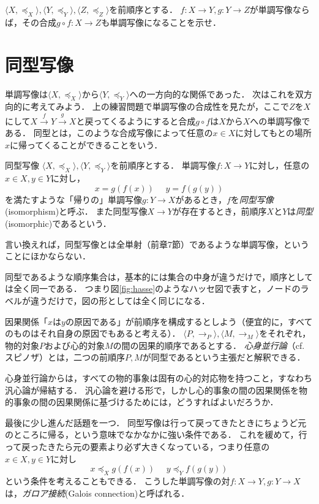 \documentclass[dvipdfmx,11pt,a4paper]{jsarticle}
\begin{document}
\begin{exercise}[単調写像の合成]
$\langle X, \preceq_X \rangle, \langle Y, \preceq_Y \rangle, \langle Z, \preceq_Z \rangle$を前順序とする．
$f:X \to Y, g:Y \to Z$が単調写像ならば，その合成$g \circ f: X \to Z$も単調写像になることを示せ． 
\end{exercise}


\section{同型写像}
単調写像は$\langle X, \preceq_X \rangle$から$\langle Y, \preceq_Y \rangle$への一方向的な関係であった．
次はこれを双方向的に考えてみよう．
上の練習問題で単調写像の合成性を見たが，ここで$Z$を$X$にして$X \xrightarrow{f} Y \xrightarrow{g} X$と戻ってくるようにすると合成$g \circ f$は$X$から$X$への単調写像である．
同型とは，このような合成写像によって任意の$x \in X$に対してもとの場所$x$に帰ってくることができることをいう．

\begin{itembox}[l]{同型写像}
$\langle X, \preceq_X \rangle, \langle Y, \preceq_Y \rangle$を前順序とする．
単調写像$f:X \to Y$に対し，任意の$x \in X, y \in Y$に対し，
\[
 x = g(f(x)) \ \ \ \ \ \ y = f(g(y))
\]
を満たすような「帰りの」単調写像$g:Y \to X$があるとき，$f$を\emph{同型写像}(isomorphism)と呼ぶ．
また同型写像$X \to Y$が存在するとき，前順序$X$と$Y$は\emph{同型}(isomorphic)であるという．
\end{itembox}
言い換えれば，同型写像とは全単射（前章7節）であるような単調写像，ということにほかならない．

同型であるような順序集合は，基本的には集合の中身が違うだけで，順序としては全く同一である．
つまり図\ref{fig:hasse}のようなハッセ図で表すと，ノードのラベルが違うだけで，図の形としては全く同じになる．


\begin{example}[心身並行論]
因果関係「$x$は$y$の原因である」が前順序を構成するとしよう（便宜的に，すべてのものはそれ自身の原因でもあると考える）．
$\langle P, \to_P \rangle, \langle M, \to_M \rangle$をそれぞれ，物的対象$P$および心的対象$M$の間の因果的順序であるとする．
\emph{心身並行論}（cf. スピノザ）とは，二つの前順序$P, M$が同型であるという主張だと解釈できる．
\end{example}

\begin{develop}
心身並行論からは，すべての物的事象は固有の心的対応物を持つこと，すなわち汎心論が帰結する．
汎心論を避ける形で，しかし心的事象の間の因果関係を物的事象の間の因果関係に基づけるためには，どうすればよいだろうか．
\end{develop}

最後に少し進んだ話題を一つ．
同型写像は行って戻ってきたときにちょうど元のところに帰る，という意味でなかなかに強い条件である．
これを緩めて，行って戻ったきたら元の要素より必ず大きくなっている，つまり任意の$x \in X, y \in Y$に対し
\[
 x \preceq_X g(f(x)) \ \ \ \ \ \ y \preceq_Y f(g(y))
\]
という条件を考えることもできる．
こうした単調写像の対$f:X \to Y, g:Y \to X$は，\emph{ガロア接続}(Galois connection)と呼ばれる．
\end{document}
